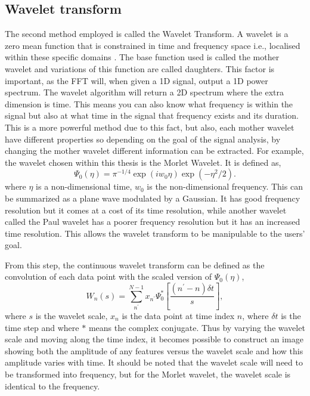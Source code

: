 \subsection{Wavelet transform}

	The second method employed is called the Wavelet Transform.
	A wavelet is a zero mean function that is constrained in time and frequency space i.e., localised within these specific domains \citep{farge1992wavelet}.
	The base function used is called the mother wavelet and variations of this function are called daughters.
	This factor is important, as the FFT will, when given a 1D signal, output a 1D power spectrum.
	The wavelet algorithm will return a 2D spectrum where the extra dimension is time.
	This means you can also know what frequency is within the signal but also at what time in the signal that frequency exists and its duration.
	This is a more powerful method due to this fact, but also, each mother wavelet have different properties so depending on the goal of the signal analysis, by changing the mother wavelet different information can be extracted. 
	For example, the wavelet chosen within this thesis is the Morlet Wavelet.
	It is defined as,
	\begin{equation}
		\Psi_0(\eta) = \pi^{-1/4} \exp(iw_0\eta)\exp(-\eta^2/2).
	\end{equation}
    where $\eta$ is a non-dimensional time, $w_0$ is the non-dimensional frequency.
    This can be summarized as a plane wave modulated by a Gaussian.
	It has good frequency resolution but it comes at a cost of its time resolution, while another wavelet called the Paul wavelet has a poorer frequency resolution but it has an increased time resolution.
	This allows the wavelet transform to be manipulable to the users' goal.
    
    From this step, the continuous wavelet transform can be defined as the convolution of each data point with the scaled version of $\Psi_0(\eta)$,
	\begin{equation}
		W_n (s) = \sum_{n^\prime}^{N-1} x_{n^\prime}\Psi_{0}^{*} \left[\frac{(n^\prime-n)\delta t}{s}\right],
	\end{equation}
    where $s$ is the wavelet scale, $x_n$ is the data point at time index $n$, where $\delta t$ is the time step and where $*$ means the complex conjugate. 
    Thus by varying the wavelet scale and moving along the time index, it becomes possible to construct an image showing both the amplitude of any features versus the wavelet scale and how this amplitude varies with time. 
    It should be noted that the wavelet scale will need to be transformed into frequency, but for the Morlet wavelet, the wavelet scale is identical to the frequency.
    
